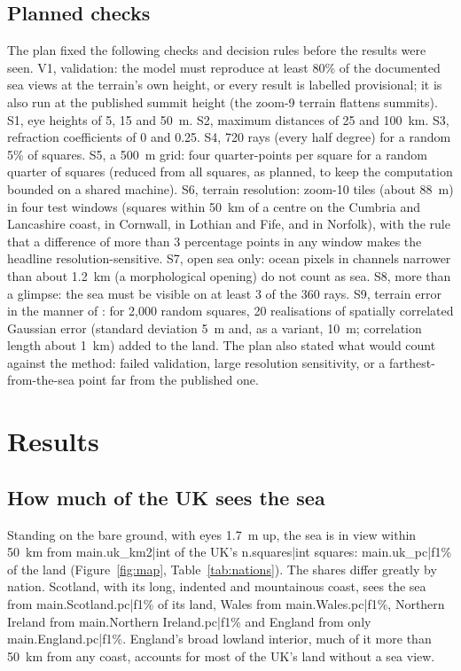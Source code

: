 \subsection{Planned checks}
The plan fixed the following checks and decision rules before the results were seen. V1, validation: the model must reproduce at least 80\% of the documented sea views at the terrain's own height, or every result is labelled provisional; it is also run at the published summit height (the zoom-9 terrain flattens summits). S1, eye heights of 5, 15 and 50~m. S2, maximum distances of 25 and 100~km. S3, refraction coefficients of 0 and 0.25. S4, 720 rays (every half degree) for a random 5\% of squares. S5, a 500~m grid: four quarter-points per square for a random quarter of squares (reduced from all squares, as planned, to keep the computation bounded on a shared machine). S6, terrain resolution: zoom-10 tiles (about 88~m) in four test windows (squares within 50~km of a centre on the Cumbria and Lancashire coast, in Cornwall, in Lothian and Fife, and in Norfolk), with the rule that a difference of more than 3 percentage points in any window makes the headline resolution-sensitive. S7, open sea only: ocean pixels in channels narrower than about 1.2~km (a morphological opening) do not count as sea. S8, more than a glimpse: the sea must be visible on at least 3 of the 360 rays. S9, terrain error in the manner of \citet{fisher1991,fisher1992}: for 2,000 random squares, 20 realisations of spatially correlated Gaussian error (standard deviation 5~m and, as a variant, 10~m; correlation length about 1~km) added to the land. The plan also stated what would count against the method: failed validation, large resolution sensitivity, or a farthest-from-the-sea point far from the published one.

\section{Results}\label{sec:results}
\subsection{How much of the UK sees the sea}
Standing on the bare ground, with eyes 1.7~m up, the sea is in view within 50~km from {{main.uk_km2|int}} of the UK's {{n.squares|int}} squares: {{main.uk_pc|f1}}\% of the land (Figure~\ref{fig:map}, Table~\ref{tab:nations}). The shares differ greatly by nation. Scotland, with its long, indented and mountainous coast, sees the sea from {{main.Scotland.pc|f1}}\% of its land, Wales from {{main.Wales.pc|f1}}\%, Northern Ireland from {{main.Northern Ireland.pc|f1}}\% and England from only {{main.England.pc|f1}}\%. England's broad lowland interior, much of it more than 50~km from any coast, accounts for most of the UK's land without a sea view.

